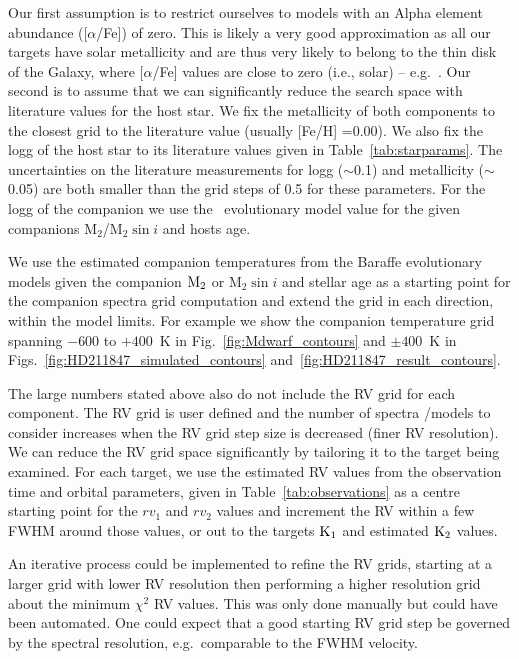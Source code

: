 Our first assumption is to restrict ourselves to models with an Alpha element abundance ([\(\alpha\)/Fe]) of zero. This is likely a very good approximation as all our targets have solar metallicity and are thus very likely to belong to the thin disk of the Galaxy, where [\(\alpha\)/Fe] values are close to zero (i.e., solar) -- e.g.~\citet{adibekyan_chemical_2012}. Our second is to assume that we can significantly reduce the search space with literature values for the host star. We fix the metallicity of both components to the closest grid to the literature value (usually [Fe/H] =0.00). We also fix the logg of the host star to its literature values given in Table~\ref{tab:starparams}. The uncertainties on the literature measurements for logg (\(\sim\)0.1) and metallicity (\(\sim\)0.05) are both smaller than the grid steps of 0.5 for these parameters.
For the logg of the companion we use the~\citet{baraffe_evolutionary_2003,baraffe_new_2015} evolutionary model value for the given companions \(\textrm{M}_2\)/\(\textrm{M}_2\sin{i}\) and hosts age.

We use the estimated companion temperatures from the Baraffe evolutionary models given the companion \(\rm M_2\) or \(\textrm{M}_2\sin{i}\) and stellar age as a starting point for the companion spectra grid computation and extend the grid in each direction, within the model limits. For example we show the companion temperature grid spanning \(-600\) to \(+400\)~K in Fig.~\ref{fig:Mdwarf_contours} and \(\pm400\)~K in Figs.~\ref{fig:HD211847_simulated_contours} and~\ref{fig:HD211847_result_contours}.

The large numbers stated above also do not include the RV grid for each component. The RV grid is user defined and the number of spectra /models to consider increases when the RV grid step size is decreased (finer RV resolution). We can reduce the RV grid space significantly by tailoring it to the target being examined. For each target, we use the estimated RV values from the observation time and orbital parameters, given in Table~\ref{tab:observations} as a centre starting point for the \({rv}_1\) and \({rv}_2\) values and increment the RV within a few FWHM around those values, or out to the targets \(\rm K_1\) and estimated \(\rm K_2\) values.

An iterative process could be implemented to refine the RV grids, starting at a larger grid with lower RV resolution then performing a higher resolution grid about the minimum \(\chi^2\) RV values. This was only done manually but could have been automated. One could expect that a good starting RV grid step be governed by the spectral resolution, e.g.\ comparable to the FWHM velocity.

